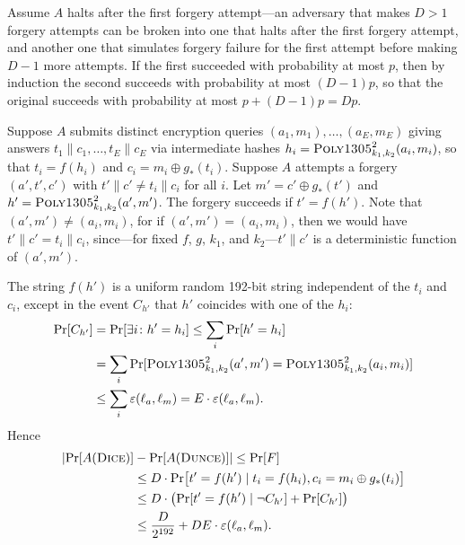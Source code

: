 \documentclass{article}
\def\operatorsc#1{{%
  \ifmmode\let\next=\operatorname\else\let\next=\relax\fi\next{\textsc{#1}}}}
\def\Poly#1/{\operatorsc{Poly#1}}
\def\DUNCE/{\operatorsc{Dunce}}
\def\DICE/{\operatorsc{Dice}}
\newcommand{\concat}{\mathbin\|}
\newcommand{\given}{\mathrel|}
\newcommand{\collisionbound}{\varepsilon}
\begin{document}
Assume $A$ halts after the first forgery attempt---an adversary that
 makes $D>1$ forgery attempts can be broken into one that halts after
 the first forgery attempt, and another one that simulates forgery
 failure for the first attempt before making $D-1$ more attempts.
If the first succeeded with probability at most $p$, then by induction
 the second succeeds with probability at most $(D - 1) p$, so that the
 original succeeds with probability at most $p + (D - 1) p = D p$.

Suppose $A$ submits distinct encryption queries
 $(a_1, m_1), \dotsc, (a_E, m_E)$
 giving answers
 $t_1 \concat c_1, \dotsc, t_E \concat c_E$
 via intermediate hashes
 $h_i = \Poly1305/^2_{k_1,k_2}(a_i, m_i)$,
 so that $t_i = f(h_i)$ and $c_i = m_i \oplus g_*(t_i)$.
Suppose $A$ attempts a forgery $(a', t', c')$ with
 $t' \concat c' \ne t_i \concat c_i$ for all $i$.
Let
 $m' = c' \oplus g_*(t')$
 and
 $h' = \Poly1305/^2_{k_1,k_2}(a', m')$.
The forgery succeeds if $t' = f(h')$.
Note that $(a', m') \ne (a_i, m_i)$, for if
 $(a', m') = (a_i, m_i)$,
 then we would have
 $t' \concat c' = t_i \concat c_i$, since---for fixed $f$, $g$, $k_1$,
 and $k_2$---$t' \concat c'$ is a deterministic function of
 $(a', m')$.

The string $f(h')$ is a uniform random 192-bit string independent of
 the $t_i$ and $c_i$, except in the event $C_{h'}$ that $h'$ coincides
 with one of the $h_i$:
%
\begin{align*}
  \Pr[C_{h'}]
  &= \Pr[\exists i\colon h' = h_i]
   \leq \sum_i \Pr[h' = h_i] \\
  &= \sum_i
       \Pr[\Poly1305/^2_{k_1,k_2}(a', m')
             = \Poly1305/^2_{k_1,k_2}(a_i, m_i)] \\
  &\leq \sum_i \collisionbound(\ell_a, \ell_m)
   = E \cdot \collisionbound(\ell_a, \ell_m).
\end{align*}
%
Hence
%
\begin{align*}
  \lvert\Pr[A(\DICE/)] &- \Pr[A(\DUNCE/)]\rvert
   \leq \Pr[F] \\
  &\leq D \cdot \Pr\bigl[t' = f(h')
            \given t_i = f(h_i), c_i = m_i \oplus g_*(t_i)\bigr] \\
  &\leq D \cdot \bigl(\Pr[t' = f(h') \given \lnot C_{h'}]
                      + \Pr[C_{h'}]\bigr) \\
  &\leq \frac{D}{2^{192}}
        + D E \cdot \collisionbound(\ell_a, \ell_m).
\end{align*}
\end{document}
